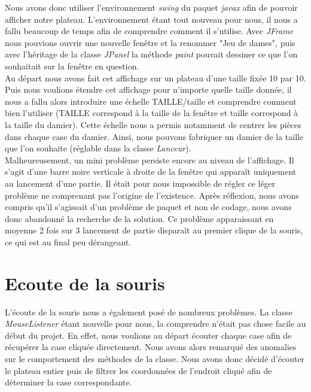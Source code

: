 \documentclass[12,french]{report}
\begin{document}
Nous avons donc utiliser l'environnement \textit{swing} du paquet \textit{javax} afin de pouvoir afficher notre plateau. L'environnement étant tout nouveau pour nous, il nous a fallu beaucoup de temps afin de comprendre comment il s'utilise. Avec \textit{JFrame} nous pouvions ouvrir une nouvelle fenêtre et la renommer "Jeu de dames", puis avec l'héritage de la classe \textit{JPanel} la méthode \textit{paint} pouvait dessiner ce que l'on souhaitait sur la fenêtre en question.\\

Au départ nous avons fait cet affichage sur un plateau d'une taille fixée 10 par 10. Puis nous voulions étendre cet affichage pour n'importe quelle taille donnée, il nous a fallu alors introduire une échelle TAILLE/taille et comprendre comment bien l'utiliser (TAILLE correspond à la taille de la fenêtre et taille correspond à la taille du damier). Cette échelle nous a permis notamment de centrer les pièces dans chaque case du damier. Ainsi, nous pouvons fabriquer un damier de la taille que l'on souhaite (réglable dans la classe \textit{Lanceur}).\\

Malheureusement, un mini problème persiste encore au niveau de l'affichage. Il s'agit d'une barre noire verticale à droite de la fenêtre qui apparaît uniquement au lancement d'une partie. Il était pour nous impossible de régler ce léger problème ne comprenant pas l'origine de l'existence. Après réflexion, nous avons compris qu'il s'agissait d'un problème de paquet et non de codage, nous avons donc abandonné la recherche de la solution. Ce problème apparaissant en moyenne 2 fois sur 3 lancement de partie disparaît au premier clique de la souris, ce qui est au final peu dérangeant.
 
\section{Ecoute de la souris}

L'écoute de la souris nous a également posé de nombreux problèmes. La classe \textit{MouseListener} étant nouvelle pour nous, la comprendre n'était pas chose facile au début du projet. En effet, nous voulions au départ écouter chaque case afin de récupérer la case cliquée directement. Nous avons alors remarqué des anomalies sur le comportement des méthodes de la classe. Nous avons donc décidé d'écouter le plateau entier puis de filtrer les coordonnées de l'endroit cliqué afin de déterminer la case correspondante.
\end{document}
